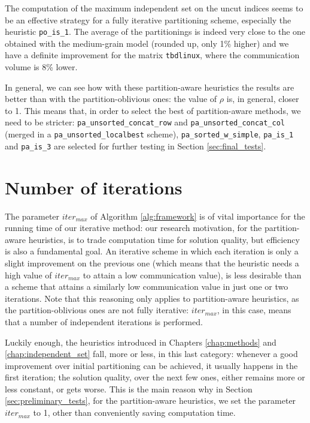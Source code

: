 The computation of the maximum independent set on the uncut indices seems to be an effective strategy for a fully iterative partitioning scheme, especially the heuristic \verb|po_is_1|. The average of the partitionings is indeed very close to the one obtained with the medium-grain model (rounded up, only 1\% higher) and we have a definite improvement for the matrix \verb|tbdlinux|, where the communication volume is 8\% lower.

In general, we can see how with these partition-aware heuristics the results are better than with the partition-oblivious ones: the value of $\rho$ is, in general, closer to 1. This means that, in order to select the best of partition-aware methods, we need to be stricter: \verb|pa_unsorted_concat_row| and \verb|pa_unsorted_concat_col| (merged in a \verb|pa_unsorted_localbest| scheme), \verb|pa_sorted_w_simple|, \verb|pa_is_1| and \verb|pa_is_3| are selected for further testing in Section \ref{sec:final_tests}.

\section{Number of iterations} \label{sec:iter_max}

The parameter $iter_{max}$ of Algorithm \ref{alg:framework} is of vital importance for the running time of our iterative method: our research motivation, for the partition-aware heuristics, is to trade computation time for solution quality, but efficiency is also a fundamental goal. An iterative scheme in which each iteration is only a slight improvement on the previous one (which means that the heuristic needs a high value of $iter_{max}$ to attain a low communication value), is less desirable than a scheme that attains a similarly low communication value in just one or two iterations. Note that this reasoning only applies to partition-aware heuristics, as the partition-oblivious ones are not fully iterative: $iter_{max}$, in this case, means that a number of independent iterations is performed.

Luckily enough, the heuristics introduced in Chapters \ref{chap:methods} and \ref{chap:independent_set} fall, more or less, in this last category: whenever a good improvement over initial partitioning can be achieved, it usually happens in the first iteration; the solution quality, over the next few ones, either remains more or less constant, or gets worse. This is the main reason why in Section \ref{sec:preliminary_tests}, for the partition-aware heuristics, we set the parameter $iter_{max}$ to 1, other than conveniently saving computation time.

